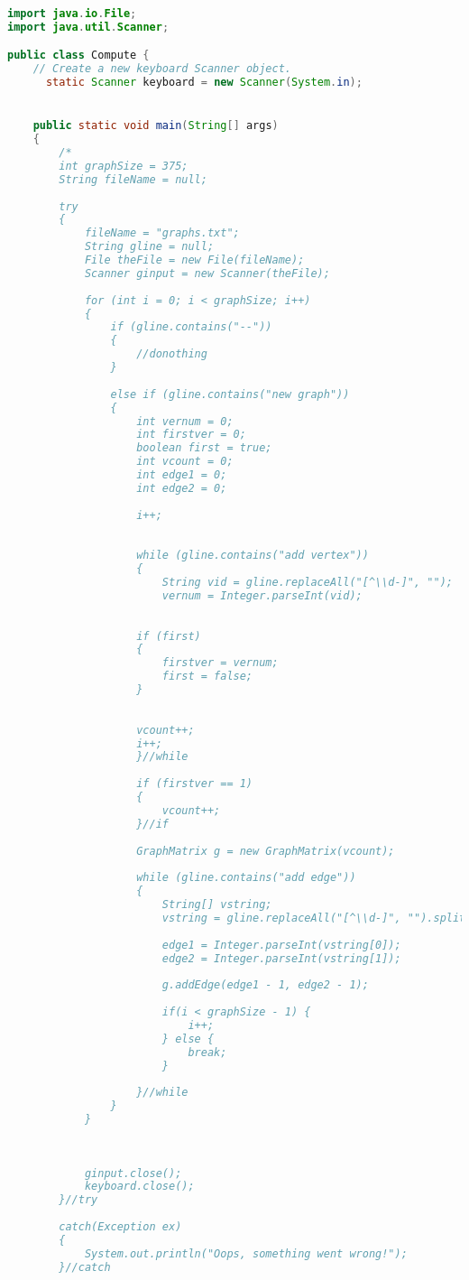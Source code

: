 \documentclass[letterpaper, 10pt]{article}
\begin{document}
\begin{lstlisting}[language = java]
import java.io.File;
import java.util.Scanner;

public class Compute {
	// Create a new keyboard Scanner object.
	  static Scanner keyboard = new Scanner(System.in);


	public static void main(String[] args) 
	{
		/*
		int graphSize = 375;
		String fileName = null;
	   
	    try
	    { 
	    	fileName = "graphs.txt";
	    	String gline = null;
	    	File theFile = new File(fileName);
	    	Scanner ginput = new Scanner(theFile);
	    	
			for (int i = 0; i < graphSize; i++)
			{
				if (gline.contains("--"))
				{
					//donothing
				}
				
				else if (gline.contains("new graph"))
				{
					int vernum = 0;
					int firstver = 0;
					boolean first = true;
					int vcount = 0;
					int edge1 = 0;
					int edge2 = 0;
					
					i++;
					
					
					while (gline.contains("add vertex"))
					{
						String vid = gline.replaceAll("[^\\d-]", "");
						vernum = Integer.parseInt(vid);
					
					
					if (first)
					{
						firstver = vernum;
						first = false;
					}
					
					
					vcount++;
					i++;
					}//while
					
					if (firstver == 1)
					{
						vcount++;
					}//if
					
					GraphMatrix g = new GraphMatrix(vcount);
					
					while (gline.contains("add edge"))
					{
						String[] vstring;
						vstring = gline.replaceAll("[^\\d-]", "").split("-");
						
						edge1 = Integer.parseInt(vstring[0]);
						edge2 = Integer.parseInt(vstring[1]);
						
						g.addEdge(edge1 - 1, edge2 - 1);
						
						if(i < graphSize - 1) {
							i++;
						} else {
							break;
						}
						
					}//while
				}
			}
			
			
		      
	    	ginput.close();
	    	keyboard.close();
	    }//try
		    
	    catch(Exception ex)
	    {
	    	System.out.println("Oops, something went wrong!");
	    }//catch
	    

\end{lstlisting}
\end{document}
